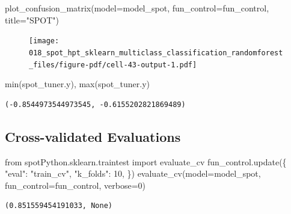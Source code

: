 \documentclass[
  letterpaper,
  DIV=11,
  numbers=noendperiod]{scrreprt}
\newenvironment{Shaded}{\begin{snugshade}}{\end{snugshade}}
\newcommand{\BuiltInTok}[1]{\textcolor[rgb]{0.00,0.23,0.31}{#1}}
\newcommand{\DecValTok}[1]{\textcolor[rgb]{0.68,0.00,0.00}{#1}}
\newcommand{\ImportTok}[1]{\textcolor[rgb]{0.00,0.46,0.62}{#1}}
\newcommand{\NormalTok}[1]{\textcolor[rgb]{0.00,0.23,0.31}{#1}}
\newcommand{\OperatorTok}[1]{\textcolor[rgb]{0.37,0.37,0.37}{#1}}
\newcommand{\StringTok}[1]{\textcolor[rgb]{0.13,0.47,0.30}{#1}}
\begin{document}
\begin{Shaded}
\begin{Highlighting}[]
\NormalTok{plot\_confusion\_matrix(model}\OperatorTok{=}\NormalTok{model\_spot, fun\_control}\OperatorTok{=}\NormalTok{fun\_control, title}\OperatorTok{=}\StringTok{"SPOT"}\NormalTok{)}
\end{Highlighting}
\end{Shaded}

\begin{figure}[H]

{\centering \texttt{[image: 018\_spot\_hpt\_sklearn\_multiclass\_classification\_randomforest\_files/figure-pdf/cell-43-output-1.pdf]}

}

\end{figure}

\begin{Shaded}
\begin{Highlighting}[]
\BuiltInTok{min}\NormalTok{(spot\_tuner.y), }\BuiltInTok{max}\NormalTok{(spot\_tuner.y)}
\end{Highlighting}
\end{Shaded}

\begin{verbatim}
(-0.8544973544973545, -0.6155202821869489)
\end{verbatim}

\hypertarget{cross-validated-evaluations}{%
\subsection{Cross-validated
Evaluations}\label{cross-validated-evaluations}}

\begin{Shaded}
\begin{Highlighting}[]
\ImportTok{from}\NormalTok{ spotPython.sklearn.traintest }\ImportTok{import}\NormalTok{ evaluate\_cv}
\NormalTok{fun\_control.update(\{}
     \StringTok{"eval"}\NormalTok{: }\StringTok{"train\_cv"}\NormalTok{,}
     \StringTok{"k\_folds"}\NormalTok{: }\DecValTok{10}\NormalTok{,}
\NormalTok{\})}
\NormalTok{evaluate\_cv(model}\OperatorTok{=}\NormalTok{model\_spot, fun\_control}\OperatorTok{=}\NormalTok{fun\_control, verbose}\OperatorTok{=}\DecValTok{0}\NormalTok{)}
\end{Highlighting}
\end{Shaded}

\begin{verbatim}
(0.851559454191033, None)
\end{verbatim}
\end{document}
